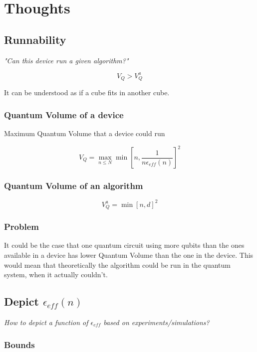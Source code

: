 \documentclass[11pt]{article}
\begin{document}
\section{Thoughts}
\label{sec:org215648b}

\subsection{Runnability}
\label{sec:org901ca49}

\emph{"Can this device run a given algorithm?"}

$$V_Q > V_Q^a$$

It can be understood as if a cube fits in another cube.

\subsubsection{Quantum Volume of a device}
\label{sec:orgfa18713}

Maximum Quantum Volume that a device could run

$$V_Q = \max_{n \le N} \min \left[ n,\frac{1}{n \epsilon_{eff} (n)}\right]^2$$

\subsubsection{Quantum Volume of an algorithm}
\label{sec:orge82ff97}

$$V_Q^a = \min \left[ n,d \right]^2$$

\subsubsection{Problem}
\label{sec:org55ba808}

It could be the case that one quantum circuit using more qubits than the ones available in a device has lower Quantum Volume than the one in the device. This would mean that theoretically the algorithm could be run in the quantum system, when it actually couldn't.

\subsection{Depict \(\epsilon_{eff}(n)\)}
\label{sec:orge5be852}

\emph{How to depict a function of \(\epsilon_{eff}\) based on experiments/simulations?}

\subsubsection{Bounds}
\label{sec:org77618f7}
\end{document}
